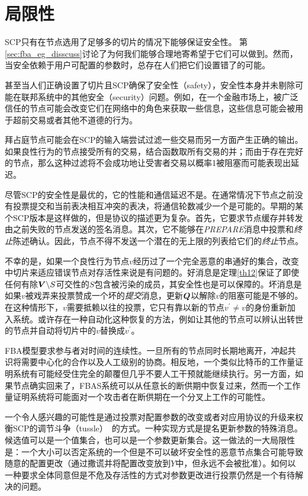 \section{局限性}\label{sec:limit}

SCP只有在节点选用了足够多的{\quorum}切片的情况下能够保证安全性。	第\ref{sec:fba_eg_disscuss}讨论了为何我们能够合理地寄希望于它们可以做到。然而，当安全依赖于用户可配置的参数时，总存在人们把它们设置错了的可能。

甚至当人们正确设置了{\quorum}切片且SCP确保了安全性（safety），安全性本身并未剔除可能在联邦系统中的其他安全（security）问题。例如，在一个金融市场上，被广泛信任的节点可能会改变它们在网络中的角色来获取一些信息，这些信息可能会被用于超前交易或者其他不道德的行为。

拜占庭节点可能会在SCP的输入端尝试过滤一些交易而另一方面产生正确的输出。如果良性行为的节点接受所有的交易，结合函数取所有交易的并；而由于存在完好的节点，那么这种过滤将不会成功地让受害者交易以概率1被阻塞而可能表现出延迟。

尽管SCP的安全性是最优的，它的性能和通信延迟不是。在通常情况下节点之前没有投票提交和当前表决相互冲突的表决，将通信轮数减少一个是可能的。早期的某个SCP版本是这样做的，但是协议的描述更为复杂。首先，它要求节点缓存并转发由之前失败的节点发送的签名消息。其次，它不能够在\textsl{PREPARE}消息中投票和\textit{终止}陈述确认。因此，节点不得不发送一个潜在的无上限的列表给它们的\textit{终止}节点。

不幸的是，如果一个良性行为节点$v$经历过了一个完全恶意的串通好的{\vblock}集合，改变{\slot}中切片来适应错误节点对存活性来说是有问题的。好消息是定理\ref{th12}保证了即使任何有除${\bm V}\backslash S${\quorum}可交性的$S$包含被污染的成员，其安全性也是可以保障的。坏消息是如果$v$被戏弄来投票赞成一个坏的\textit{提交}消息，更新${\bm Q}$以解除$v$的阻塞可能是不够的。在这种情形下，$v$需要抵赖以往的投票，它只有靠以新的节点$v^{\prime}\neq v$的身份重新加入系统。或许存在一种自动化这种恢复的方法，例如让其他的节点可以辨认出转世的节点并自动将切片中的$v$替换成$v^{\prime}$。

FBA模型要求参与者对时间的连续性。一旦所有的节点同时长期地离开，冲起共识将需要中心化的合作以及人工级别的协商。相反地，一个类似比特币的工作量证明系统有可能经受住完全的颠覆但几乎不要人工干预就能继续执行。另一方面，如果节点确实回来了，FBAS系统可以从任意长的断供期中恢复过来，然而一个工作量证明系统将可能面对一个攻击者在断供期在一个分叉上工作的可能性。

一个令人感兴趣的可能性是通过投票对配置参数的改变或者对应用协议的升级来权衡SCP的调节斗争（tussle）~\cite{Clark:2005:TCD:1074047.1074049}的方式。一种实现方式是提名更新参数的特殊消息。候选值可以是一个值集合，也可以是一个参数更新集合。这一做法的一大局限性是：一个大小可以否定系统的一个{\quorum}但是不可以破坏安全性的恶意节点集合可能导致随意的配置更改（通过撒谎并将配置改变放到$Y$中，但永远不会被批准）。如何以一种要求全体{\quorum}同意但是不危及存活性的方式对参数更改进行投票仍然是一个有待解决的问题。